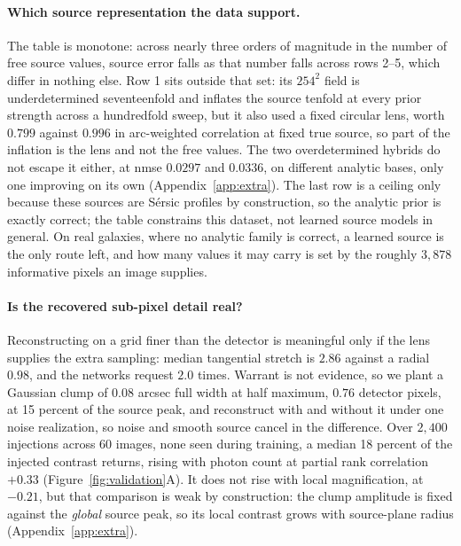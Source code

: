 \documentclass{article}
\begin{document}
\paragraph{Which source representation the data support.} The table is monotone:
across nearly three orders of magnitude in the number of free source values,
source error falls as that number falls across rows 2--5, which differ in nothing
else. Row 1
sits outside that set: its $254^{2}$ field is underdetermined seventeenfold and
inflates the source tenfold at every prior strength across a hundredfold sweep,
but it also used a fixed circular lens, worth $0.799$ against $0.996$ in
arc-weighted correlation at fixed true source, so part of the inflation is the
lens and not the free values. The two
overdetermined hybrids do not escape it either, at nmse $0.0297$ and $0.0336$,
on different analytic bases, only one improving on its own
(Appendix~\ref{app:extra}). The last row is a ceiling only because these sources
are S\'ersic profiles by construction, so the analytic prior is exactly correct;
the table constrains this dataset, not learned source models in general. On real galaxies, where no analytic family is
correct, a learned source is the only route left, and how many values it may
carry is set by the roughly $3{,}878$ informative pixels an image supplies.

\paragraph{Is the recovered sub-pixel detail real?} Reconstructing on a grid
finer than the detector is meaningful only if the lens supplies the extra
sampling: median tangential stretch is $2.86$ against a radial $0.98$, and the
networks request $2.0$ times. Warrant is not evidence, so we plant a Gaussian
clump of $0.08$ arcsec full width at half maximum, $0.76$ detector pixels, at 15
percent of the source peak, and reconstruct with and without it under one noise
realization, so noise and smooth source cancel in the difference.
Over $2{,}400$ injections across 60 images, none seen during training, a median
18 percent of the injected contrast returns, rising with photon count at partial
rank correlation $+0.33$
(Figure~\ref{fig:validation}A). It does not rise with local magnification, at
$-0.21$, but that comparison is weak by construction: the clump amplitude is
fixed against the \emph{global} source peak, so its local contrast grows with
source-plane radius (Appendix~\ref{app:extra}).
\end{document}
